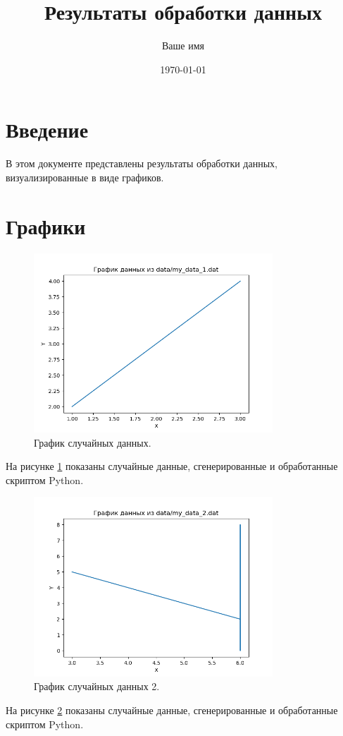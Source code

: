 \documentclass{article}
\begin{document}
\title{Результаты обработки данных}
\author{Ваше имя}
\date{\today}

\maketitle

\section{Введение}

В этом документе представлены результаты обработки данных, визуализированные в виде графиков.

\section{Графики}

\begin{figure}[h!]
    \centering
    \includegraphics[width=0.8\textwidth]{figures/my_data_1.png}
    \caption{График случайных данных.}
    \label{fig:my_data_1}
\end{figure}

На рисунке \ref{fig:my_data_1} показаны случайные данные, сгенерированные и обработанные скриптом Python.

\begin{figure}[h!]
    \centering
    \includegraphics[width=0.8\textwidth]{figures/my_data_2.png}
    \caption{График случайных данных 2.}
    \label{fig:my_data_2}
\end{figure}

На рисунке \ref{fig:my_data_2} показаны случайные данные, сгенерированные и обработанные скриптом Python.
\end{document}
